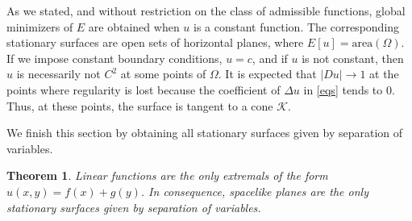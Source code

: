 \documentclass[a4paper,12pt]{amsart}
\newtheorem{theorem}{Theorem}[section]
\theoremstyle{definition}
\newtheorem{remark}[theorem]{Remark}
\begin{document}


As we stated, and without   restriction on the class of admissible functions, global minimizers of $E$ are obtained when $u$ is a constant function. The corresponding stationary surfaces are open sets of horizontal planes, where   $E[u]=\mbox{area}(\Omega)$. If we impose constant boundary conditions, $u=c$, and  if $u$ is not constant, then   $u$ is  necessarily not $C^2$ at some points of $\Omega$. It is expected that $|Du|\to 1$ at the points where regularity is lost because the coefficient of $\Delta u$ in \eqref{eqs} tends to $0$.  Thus, at these points, the surface is tangent to a cone $\mathcal{K}$.

We finish this section by obtaining all stationary surfaces given by separation of variables. 

\begin{theorem}\label{t23}
 Linear functions are the only extremals of the form $u(x,y)=f(x)+g(y)$. In consequence, spacelike planes are the only  stationary surfaces given by separation of variables.
\end{theorem}
\end{document}
